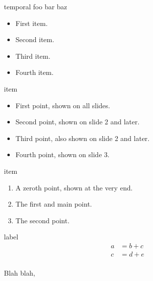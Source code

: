 \documentclass{beamer}
\begin{document}
\begin{frame}{temporal}
foo
bar
baz
\end{frame}

\def\colorize<#1>{%
  }

\begin{frame}
  \begin{itemize}
    \colorize<1> \item First item.
    \colorize<2> \item Second item.
    \colorize<3> \item Third item.
    \colorize<4> \item Fourth item.
  \end{itemize}
\end{frame}

%

\begin{frame}{item}
  \begin{itemize}
  \item<1-> First point, shown on all slides.
  \item<2-> Second point, shown on slide 2 and later.
  \item<2-> Third point, also shown on slide 2 and later.
  \item<3-> Fourth point, shown on slide 3.
  \end{itemize}
\end{frame}

\begin{frame}{item}
  \begin{enumerate}
  \item<3-| alert@3>[0.] A zeroth point, shown at the very end.
  \item<1-| alert@1> The first and main point.
  \item<2-| alert@2> The second point.
  \end{enumerate}
\end{frame}


\begin{frame}{label}
  \begin{align}
    a &= b + c   \label{first}\\ %
    c &= d + e
  \end{align}    \label{second}\\%

  Blah blah, 

\end{frame}
\end{document}
